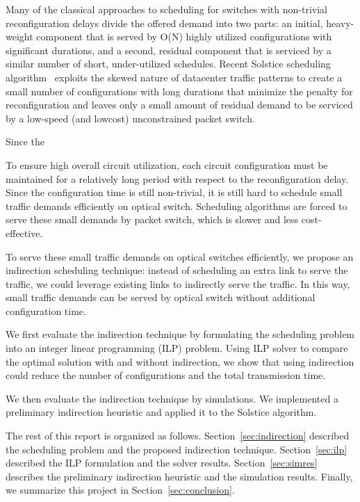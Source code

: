 Many of the classical approaches to scheduling for switches with
non-trivial reconfiguration delays divide the offered demand into two
parts: an initial, heavy-weight component that is served by O(N) highly
utilized configurations with significant durations, and a second,
residual component that is serviced by a similar number of short,
under-utilized schedules. Recent Solstice scheduling
algorithm~\cite{Liu:2014} exploits the skewed nature of datacenter
traffic patterns to create a small number of configurations with long
durations that minimize the penalty for reconfiguration and leaves only
a small amount of residual demand to be serviced by a low-speed (and
lowcost) unconstrained packet switch.

Since the 

To ensure high overall circuit utilization, each circuit configuration
must be maintained for a relatively long period with respect to the
reconfiguration delay. Since the configuration time is still
non-trivial, it is still hard to schedule small traffic demands
efficiently on optical switch. Scheduling algorithms are forced to
serve these small demands by packet switch, which is slower and less
cost-effective.

To serve these small traffic demands on optical switches efficiently, we
propose an indirection scheduling technique: instead of scheduling an
extra link to serve the traffic, we could leverage existing links to
indirectly serve the traffic. In this way, small traffic demands can
be served by optical switch without additional configuration time.

We first evaluate the indirection technique by formulating the scheduling
problem into an integer linear programming (ILP) problem. Using ILP solver
to compare the optimal solution with and without indirection, we show that
using indirection could reduce the number of configurations and the
total transmission time.

We then evaluate the indirection technique by simulations. We implemented a
preliminary indirection heuristic and applied it to the Solstice algorithm.

The rest of this report is organized as follows.
Section~\ref{sec:indirection} described the scheduling problem and the
proposed indirection technique. Section~\ref{sec:ilp} described the ILP
formulation and the solver results. Section~\ref{sec:simres} describes
the preliminary indirection heuristic and the simulation results.
Finally, we summarize this project in Section~\ref{sec:conclusion}.


